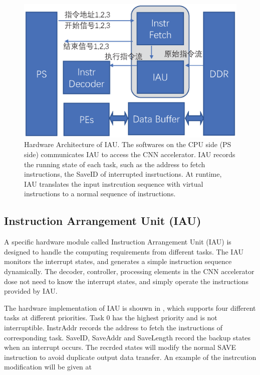 \begin{figure}[t]
	\centering
	\includegraphics[width=0.99\linewidth]{fig/IAU.eps}
	\caption{Hardware Architecture of IAU. The softwares on the CPU side (PS side) communicates IAU to access the CNN accelerator. IAU records the running state of each task, such as the address to fetch instructions, the SaveID of interrupted insrtuctions. At runtime, IAU translates the input instrcution sequence with virtual instructions to a normal sequence of instructions. }
	\label{fig:IAU}
\end{figure}

\subsection{ Instruction Arrangement Unit (IAU) }

A specific hardware module called Instruction Arrangement Unit (IAU) is designed to handle the computing requirements from different tasks. The IAU monitors the interrupt states, and generates a simple instruction sequence dynamically. The decoder, controller, processing elements in the CNN accelerator dose not need to know the interrupt states, and simply operate the instructions provided by IAU.

The hardware implementation of IAU is shouwn in , which supports four different tasks at different priorities. Task 0 has the highest priority and is not interruptible. InstrAddr records the address to fetch the instructions of corresponding task. SaveID, SaveAddr and SaveLength record the backup states when an interrupt occurs. The recrded states will modify the normal SAVE instruction to avoid duplicate output data transfer. An example of the instrcution modification will be given at 


